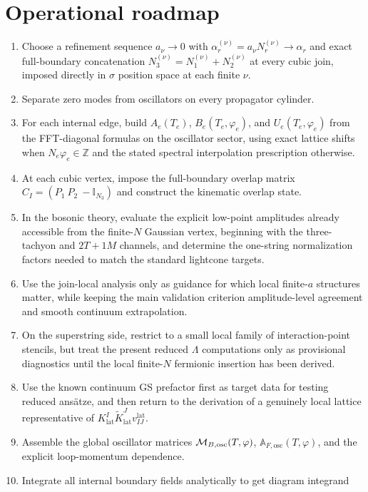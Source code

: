 \documentclass[11pt]{article}
\numberwithin{equation}{section}
\newcommand{\ZZ}{\mathbb{Z}}
\begin{document}
\section{Operational roadmap}
\begin{enumerate}
\item Choose a refinement sequence $a_\nu\to 0$ with $\alpha_r^{(\nu)}=a_\nu N_r^{(\nu)}\to \alpha_r$ and exact full-boundary concatenation $N_3^{(\nu)}=N_1^{(\nu)}+N_2^{(\nu)}$ at every cubic join, imposed directly in $\sigma$ position space at each finite $\nu$.
\item Separate zero modes from oscillators on every propagator cylinder.
\item For each internal edge, build $A_e(T_e)$, $B_e(T_e,\varphi_e)$, and $U_e(T_e,\varphi_e)$ from the FFT-diagonal formulas on the oscillator sector, using exact lattice shifts when $N_e\varphi_e\in\ZZ$ and the stated spectral interpolation prescription otherwise.
\item At each cubic vertex, impose the full-boundary overlap matrix $C_I=(P_1\ P_2\ -\mathbb I_{N_3})$ and construct the kinematic overlap state.
\item In the bosonic theory, evaluate the explicit low-point amplitudes already accessible from the finite-$N$ Gaussian vertex, beginning with the three-tachyon and $2T+1M$ channels, and determine the one-string normalization factors needed to match the standard lightcone targets.
\item Use the join-local analysis only as guidance for which local finite-$a$ structures matter, while keeping the main validation criterion amplitude-level agreement and smooth continuum extrapolation.
\item On the superstring side, restrict to a small local family of interaction-point stencils, but treat the present reduced $\Lambda$ computations only as provisional diagnostics until the local finite-$N$ fermionic insertion has been derived.
\item Use the known continuum GS prefactor first as target data for testing reduced ans\"atze, and then return to the derivation of a genuinely local lattice representative of $K^I_{\mathrm{lat}}\widetilde K^J_{\mathrm{lat}}v^{\mathrm{lat}}_{IJ}$.
\item Assemble the global oscillator matrices ${\cal M}_{B,\mathrm{osc}}(T,\varphi)$, $\mathbb A_{F,\mathrm{osc}}(T,\varphi)$, and the explicit loop-momentum dependence.
\item Integrate all internal boundary fields analytically to get diagram integrand

\end{enumerate}
\end{document}
